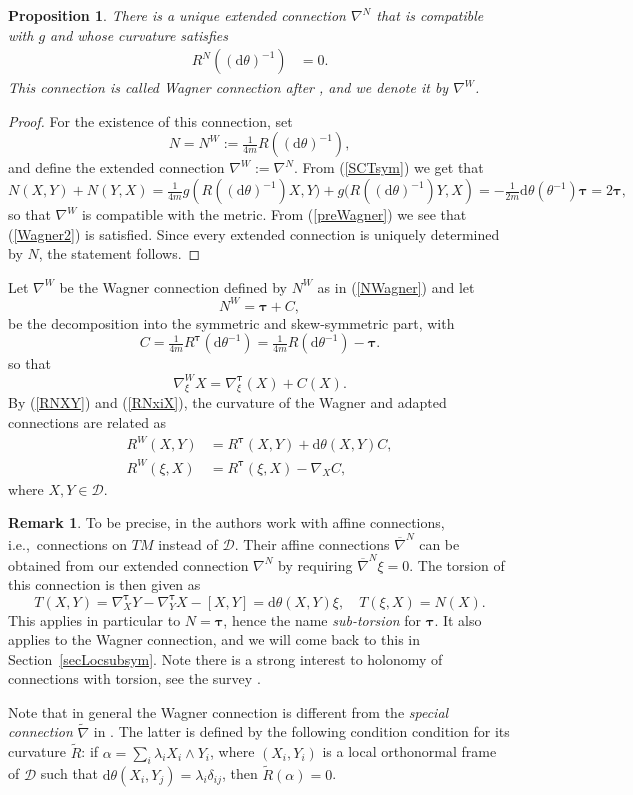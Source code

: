 \documentclass{amsart}
\theoremstyle{plain}
\newtheorem{prop}[theorem]{Proposition}
\theoremstyle{definition}
\newtheorem{rem}[theorem]{Remark}
\newcommand{\bt}{{\boldsymbol{\tau}}}
\newcommand{\1}{\mathbf{1}}
\newcommand{\D}{{\mathcal D}}
\renewcommand{\d}{\mathrm{d}}
\newcommand{\+}{\oplus}
\newcommand{\N}{N}
\begin{document}
\begin{prop}
There is a unique extended connection $\nabla^\N$ that is compatible with $g$ and whose curvature satisfies 
 \begin{align}
 \label{Wagner2}
 R^\N ((\d\theta)^{-1})&=0.
\end{align}
This connection is called {\em Wagner connection} after \cite{Wagner41}, and we denote it by $\nabla^W$.
\end{prop}
 \begin{proof}
For the existence of this connection, set
\begin{equation}\label{NWagner} \N=\N^W:=\tfrac{1}{4m}R((\d\theta)^{-1}),\end{equation}
and define the extended connection $\nabla^W:=\nabla^\N$.
From (\ref{SCTsym}) we get that
\[\N(X,Y)+\N(Y,X)= \tfrac{1}{4m}g\left(R((\d\theta)^{-1})X,Y)+ g(R((\d\theta)^{-1})Y,X\right)= - \tfrac{1}{2m}\d\theta(\theta^{-1})\bt=2\bt,
\]
so that $\nabla^W$ is compatible with the metric. From (\ref{preWagner}) we see that 
(\ref{Wagner2}) is satisfied. Since every extended connection is uniquely determined by $\N$, the statement follows.
\end{proof}
Let $\nabla^W$ be the Wagner connection defined by  $\N^W$ as in (\ref{NWagner}) and let
$$\N^W=\bt+C,$$ be the decomposition into the symmetric and skew-symmetric part, with 
\[C=\tfrac{1}{4m} R^\bt(\d\theta^{-1})=
\tfrac{1}{4m} R(\d\theta^{-1})- \bt.
\]
so that
\[\nabla^W_\xi X=\nabla^\bt_\xi(X)+C(X).\]
By (\ref{RNXY}) and (\ref{RNxiX}), the curvature of the Wagner and adapted connections are related as
\begin{align}
\label{RWtxy}
R^W(X,Y)&=R^\bt(X,Y)+\d\theta (X,Y)C,\\
R^W(\xi,X)&=R^\bt(\xi,X)-\nabla_XC,\label{RWRAC}
\end{align}
where $X,Y\in\D $. 
\begin{rem}
To be precise, in \cite{FG,FGR} the authors work with  affine connections, i.e.,~connections on $TM$ instead of  $\D$. Their affine connections 
$\overline{\nabla}^N$ can be obtained from our extended connection  $\nabla^N$ by requiring $\overline{\nabla}^N\xi=0$. The torsion of this connection is then given as 
\[T(X,Y)= \nabla^\bt_XY-\nabla^\bt_YX-[X,Y]=\d\theta(X,Y)\xi,\quad T(\xi,X)=N(X).\]
This applies in particular to $N=\bt$, hence the name {\em sub-torsion} for $\bt$. It also applies to the Wagner connection, and we will come back to this in Section~\ref{secLocsubsym}. Note there is a strong interest to holonomy of connections with torsion, see the survey \cite{A10}.

Note that in general the Wagner connection is different from the  {\em special connection} $\tilde\nabla$ in \cite[Section 2.2]{FGR}. The latter is defined by the following condition condition for its curvature $\tilde{R}$: if  $\alpha =\sum_i \lambda_iX_i\wedge Y_i$,  where $(X_i,Y_i)$ is a local orthonormal frame of $\D$ such that $\d\theta (X_i,Y_j)=\lambda_i\delta_{ij}$, then $\tilde{R}(\alpha)=0$.
\end{rem}
\end{document}

